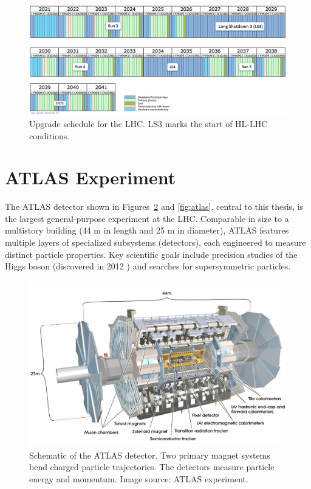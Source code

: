 \begin{figure}[H]
\centering
\includegraphics[width=\textwidth]{images/introduction/LHC-schedule.png}
\caption[Upgrade schedule for the LHC]{Upgrade schedule for the LHC. LS3 marks the start of HL-LHC conditions. \protect\cite{lhc_upgrade_schedule}}
\label{fig:LHC-schedule}
\end{figure}

\clearpage
\section{ATLAS Experiment}

The \acs{ATLAS} detector \cite{atlas-experiment} shown in Figures~\ref{fig:atlas-model} and \ref{fig:atlas}, central to this thesis, is the largest general-purpose experiment at the \acs{LHC}. Comparable in size to a multistory building (44 m in length and 25 m in diameter), \acs{ATLAS} features multiple layers of specialized subsystems (detectors), each engineered to measure distinct particle properties. Key scientific goals include precision studies of the Higgs boson (discovered in 2012 \cite{atlas-higgs-discovery}) and searches for supersymmetric particles.

\begin{figure}[H]
\centering
\includegraphics[width=\textwidth]{images/introduction/atlas-model.jpg}
\caption[Schematic of the ATLAS detector]{Schematic of the \acs{ATLAS} detector. Two primary magnet systems bend charged particle trajectories. The detectors measure particle energy and momentum. Image source: \acs{ATLAS} experiment. \protect\cite{atlas-experiment}}
\label{fig:atlas-model}
\end{figure}

